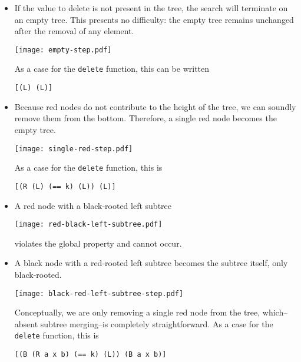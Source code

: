 \documentclass[preprint]{sigplanconf}
\begin{document}
\begin{itemize}

\item If the value to delete is not present in the tree, the search will terminate on an empty tree. This presents no difficulty: the empty tree remains unchanged after the removal of any element.
\begin{center}
\texttt{[image: empty-step.pdf]}
\end{center}
As a case for the \texttt{delete} function, this can be written
\begin{verbatim}
[(L) (L)]
\end{verbatim}

\item Because red nodes do not contribute to the height of the tree, we can soundly remove them from the bottom. Therefore, a single red node becomes the empty tree.
\begin{center}
\texttt{[image: single-red-step.pdf]}
\end{center}
As a case for the \texttt{delete} function, this is
\begin{verbatim}
[(R (L) (== k) (L)) (L)]
\end{verbatim}

\item A red node with a black-rooted left subtree
\begin{center}
\texttt{[image: red-black-left-subtree.pdf]}
\end{center}
violates the global property and cannot occur.

\item A black node with a red-rooted left subtree becomes the subtree itself, only black-rooted.
\begin{center}
\texttt{[image: black-red-left-subtree-step.pdf]}
\end{center}
Conceptually, we are only removing a single red node from the tree, which--absent subtree merging--is completely straightforward. As a case for the \texttt{delete} function, this is
\begin{verbatim}
[(B (R a x b) (== k) (L)) (B a x b)]
\end{verbatim}


\end{itemize}
\end{document}
